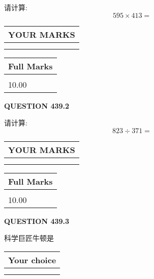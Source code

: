 \documentclass{ctexart}
\begin{document}
  
 
请计算:
\begin{equation}
595  \times    %
413 = \nonumber
\end{equation}
 

 

 
  
\vspace{0.2in}
  
\noindent\begin{tabular}{|l|}
\hline
 YOUR MARKS  \\
\hline
 \\ 
 \\ 
\hline
\end{tabular}
\hspace{0.05in} \begin{tabular}{|l|}
\hline
 Full Marks  \\
\hline
 \\ 
10.00 \\
\hline
\end{tabular}
{\textbf{\Large{QUESTION
439.2 
}}}
  
  
 
请计算:
\begin{equation}
823  \div    %
371 = \nonumber
\end{equation}
 

 

 
  
\vspace{0.2in}
  
\noindent\begin{tabular}{|l|}
\hline
 YOUR MARKS  \\
\hline
 \\ 
 \\ 
\hline
\end{tabular}
\hspace{0.05in} \begin{tabular}{|l|}
\hline
 Full Marks  \\
\hline
 \\ 
10.00 \\
\hline
\end{tabular}
{\textbf{\Large{QUESTION
439.3 
}}}
  
  
科学巨匠牛顿是
  
  
\noindent\hspace{3.0in} \begin{tabular}{|l|}
\hline
Your choice \\
\hline
 \\ 
 \\ 
\hline
\end{tabular}
  
\end{document}
